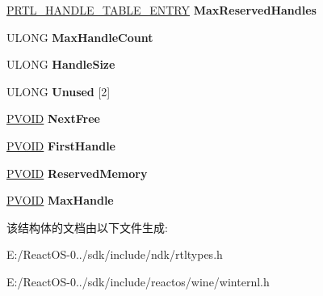 \begin{DoxyCompactItemize}
\item 
\mbox{\label{struct___r_t_l___h_a_n_d_l_e___t_a_b_l_e_a9f1b4353630874787cc0a6bdef42a24a}} 
\hyperlink{struct___r_t_l___h_a_n_d_l_e___t_a_b_l_e___e_n_t_r_y}{P\+R\+T\+L\+\_\+\+H\+A\+N\+D\+L\+E\+\_\+\+T\+A\+B\+L\+E\+\_\+\+E\+N\+T\+RY} {\bfseries Max\+Reserved\+Handles}
\item 
\mbox{\label{struct___r_t_l___h_a_n_d_l_e___t_a_b_l_e_a98d85eeb5e41b3e41cd69223db75dd03}} 
U\+L\+O\+NG {\bfseries Max\+Handle\+Count}
\item 
\mbox{\label{struct___r_t_l___h_a_n_d_l_e___t_a_b_l_e_a9f6a3d7e10562e683aafcd671710f7ad}} 
U\+L\+O\+NG {\bfseries Handle\+Size}
\item 
\mbox{\label{struct___r_t_l___h_a_n_d_l_e___t_a_b_l_e_a7e590d115c20af682ebc6550c017b07a}} 
U\+L\+O\+NG {\bfseries Unused} \mbox{[}2\mbox{]}
\item 
\mbox{\label{struct___r_t_l___h_a_n_d_l_e___t_a_b_l_e_a88223acce47668240a8cc2607a97a8b8}} 
\hyperlink{interfacevoid}{P\+V\+O\+ID} {\bfseries Next\+Free}
\item 
\mbox{\label{struct___r_t_l___h_a_n_d_l_e___t_a_b_l_e_a2ca7cf36d4e1a0beeaa0be157c33e52b}} 
\hyperlink{interfacevoid}{P\+V\+O\+ID} {\bfseries First\+Handle}
\item 
\mbox{\label{struct___r_t_l___h_a_n_d_l_e___t_a_b_l_e_a293698d54538e6d168ad644e2fda13c7}} 
\hyperlink{interfacevoid}{P\+V\+O\+ID} {\bfseries Reserved\+Memory}
\item 
\mbox{\label{struct___r_t_l___h_a_n_d_l_e___t_a_b_l_e_a542df6a1d20c1cd0cdf39be075c18f12}} 
\hyperlink{interfacevoid}{P\+V\+O\+ID} {\bfseries Max\+Handle}
\end{DoxyCompactItemize}


该结构体的文档由以下文件生成\+:\begin{DoxyCompactItemize}
\item 
E\+:/\+React\+O\+S-\/0../sdk/include/ndk/rtltypes.\+h\item 
E\+:/\+React\+O\+S-\/0../sdk/include/reactos/wine/winternl.\+h\end{DoxyCompactItemize}
